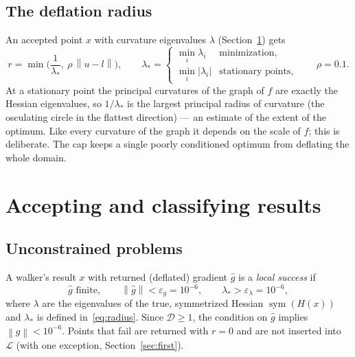 \documentclass[11pt]{article}
\newcommand{\norm}[1]{\left\lVert #1 \right\rVert}
\DeclareMathOperator{\sym}{sym}
\begin{document}
\subsection{The deflation radius}\label{sec:radius}

An accepted point $x$ with curvature eigenvalues $\lambda$ (Section~\ref{sec:accept}) gets
\begin{equation}\label{eq:radius}
  r = \min\!\Big(\frac{1}{\lambda_*},\ \rho\,\norm{u - l}\Big), \qquad
  \lambda_* = \begin{cases} \min_i \lambda_i & \text{minimization},\\ \min_i |\lambda_i| & \text{stationary points},\end{cases}
  \qquad \rho = 0.1 .
\end{equation}
At a stationary point the principal curvatures of the graph of $f$ are exactly the Hessian
eigenvalues, so $1/\lambda_*$ is the largest principal radius of curvature (the osculating
circle in the flattest direction) --- an estimate of the extent of the optimum. Like every
curvature of the graph it depends on the scale of $f$; this is deliberate. The cap keeps a
single poorly conditioned optimum from deflating the whole domain.

\section{Accepting and classifying results}\label{sec:accept}

\subsection{Unconstrained problems}

A walker's result $x$ with returned (deflated) gradient $\hat g$ is a \emph{local success} if
\begin{equation}\label{eq:accept}
  \hat g \text{ finite}, \qquad \norm{\hat g} < \varepsilon_g = 10^{-6}, \qquad
  \lambda_* > \varepsilon_\lambda = 10^{-6},
\end{equation}
where $\lambda$ are the eigenvalues of the true, symmetrized Hessian $\sym(H(x))$ and
$\lambda_*$ is defined in~\eqref{eq:radius}. Since $\mathcal{D} \ge 1$, the condition on
$\hat g$ implies $\norm{g} < 10^{-6}$. Points that fail are returned with $r = 0$ and are not
inserted into $\mathcal{L}$ (with one exception, Section~\ref{sec:first}).
\end{document}
